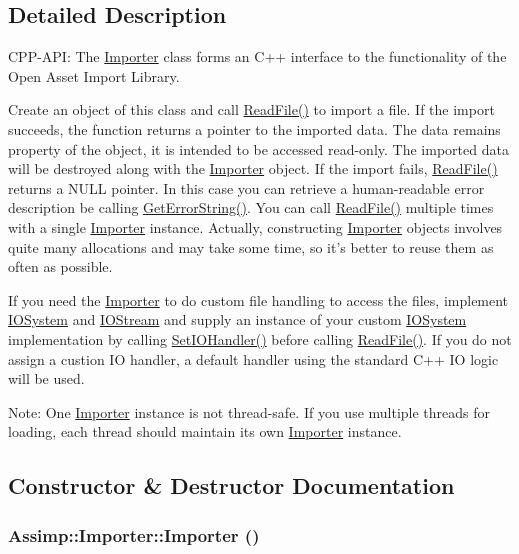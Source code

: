 \subsection{Detailed Description}
CPP-API: The \hyperlink{class_assimp_1_1_importer}{Importer} class forms an C++ interface to the functionality of the Open Asset Import Library.

Create an object of this class and call \hyperlink{class_assimp_1_1_importer_174418ab41d5b8bc51a044895cb991e5}{ReadFile()} to import a file. If the import succeeds, the function returns a pointer to the imported data. The data remains property of the object, it is intended to be accessed read-only. The imported data will be destroyed along with the \hyperlink{class_assimp_1_1_importer}{Importer} object. If the import fails, \hyperlink{class_assimp_1_1_importer_174418ab41d5b8bc51a044895cb991e5}{ReadFile()} returns a NULL pointer. In this case you can retrieve a human-readable error description be calling \hyperlink{class_assimp_1_1_importer_23bab5ba8cb9b6886c690a610766668b}{GetErrorString()}. You can call \hyperlink{class_assimp_1_1_importer_174418ab41d5b8bc51a044895cb991e5}{ReadFile()} multiple times with a single \hyperlink{class_assimp_1_1_importer}{Importer} instance. Actually, constructing \hyperlink{class_assimp_1_1_importer}{Importer} objects involves quite many allocations and may take some time, so it's better to reuse them as often as possible.

If you need the \hyperlink{class_assimp_1_1_importer}{Importer} to do custom file handling to access the files, implement \hyperlink{class_assimp_1_1_i_o_system}{IOSystem} and \hyperlink{class_assimp_1_1_i_o_stream}{IOStream} and supply an instance of your custom \hyperlink{class_assimp_1_1_i_o_system}{IOSystem} implementation by calling \hyperlink{class_assimp_1_1_importer_1161f46318af18bb86dfe0fc3edea4df}{SetIOHandler()} before calling \hyperlink{class_assimp_1_1_importer_174418ab41d5b8bc51a044895cb991e5}{ReadFile()}. If you do not assign a custion IO handler, a default handler using the standard C++ IO logic will be used.

\begin{Desc}
\item[Note:]One \hyperlink{class_assimp_1_1_importer}{Importer} instance is not thread-safe. If you use multiple threads for loading, each thread should maintain its own \hyperlink{class_assimp_1_1_importer}{Importer} instance. \end{Desc}


\subsection{Constructor \& Destructor Documentation}
\hypertarget{class_assimp_1_1_importer_2c207299ed05f1db1ad1e6dab005f719}{
\subsubsection[Importer]{\setlength{\rightskip}{0pt plus 5cm}Assimp::Importer::Importer ()}}
\label{class_assimp_1_1_importer_2c207299ed05f1db1ad1e6dab005f719}


